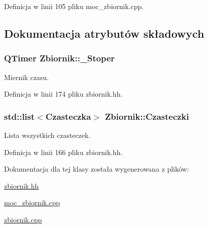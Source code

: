 Definicja w linii 105 pliku moc\+\_\+zbiornik.\+cpp.



\subsection{Dokumentacja atrybutów składowych}
\hypertarget{class_zbiornik_a5ca8ac1357ef59110d4a9e12aae2bd99}{}
\subsubsection[{\+\_\+\+Stoper}]{\setlength{\rightskip}{0pt plus 5cm}Q\+Timer Zbiornik\+::\+\_\+\+Stoper\hspace{0.3cm}{\ttfamily [private]}}\label{class_zbiornik_a5ca8ac1357ef59110d4a9e12aae2bd99}
Miernik czasu. 

Definicja w linii 174 pliku zbiornik.\+hh.

\hypertarget{class_zbiornik_a751209f2f02a7eaf3b7a3283d8fcd3ad}{}
\subsubsection[{Czasteczki}]{\setlength{\rightskip}{0pt plus 5cm}std\+::list$<${\bf Czasteczka}$>$ Zbiornik\+::\+Czasteczki}\label{class_zbiornik_a751209f2f02a7eaf3b7a3283d8fcd3ad}
Lista wszystkich czasteczek. 

Definicja w linii 166 pliku zbiornik.\+hh.



Dokumentacja dla tej klasy została wygenerowana z plików\+:\begin{DoxyCompactItemize}
\item 
\hyperlink{zbiornik_8hh}{zbiornik.\+hh}\item 
\hyperlink{moc__zbiornik_8cpp}{moc\+\_\+zbiornik.\+cpp}\item 
\hyperlink{zbiornik_8cpp}{zbiornik.\+cpp}\end{DoxyCompactItemize}
